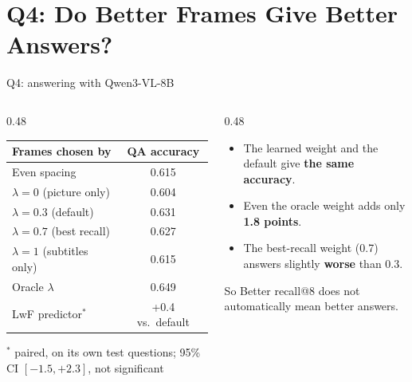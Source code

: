 \documentclass[aspectratio=169,11pt]{beamer}
\newcommand{\lam}{\lambda}
\newcommand{\strong}[1]{\textcolor{mbzuai-navy}{\textbf{#1}}}
\newcommand{\bad}[1]{\textcolor{red!65!black}{\textbf{#1}}}
\begin{document}
\section{Q4: Do Better Frames Give Better Answers?}

\begin{frame}{Q4: answering with Qwen3-VL-8B}
  \begin{columns}[c,onlytextwidth]
    \begin{column}{0.48\textwidth}
      \centering
      \small
      \begin{tabular}{lc}
        \toprule
        Frames chosen by & QA accuracy \\
        \midrule
        Even spacing & 0.615 \\
        $\lam=0$ (picture only) & 0.604 \\
        \rowcolor{mbzuai-light-gray}
        $\lam=0.3$ (default) & 0.631 \\
        $\lam=0.7$ (best recall) & 0.627 \\
        $\lam=1$ (subtitles only) & 0.615 \\
        Oracle $\lam$ & 0.649 \\
        \midrule
        LwF predictor$^*$ & +0.4 vs.\ default \\
        \bottomrule
      \end{tabular}
      \par\vspace{1mm}
      {\scriptsize $^*$ paired, on its own test questions; 95\% CI $[-1.5, +2.3]$, not significant}
    \end{column}
    \begin{column}{0.48\textwidth}
      \begin{itemize}
        \item The learned weight and the default give \strong{the same accuracy}.
        \item Even the oracle weight adds only \strong{1.8 points}.
        \item The best-recall weight (0.7) answers slightly \bad{worse} than 0.3.
      \end{itemize}
      \vspace{2mm}
      \begin{alertblock}{So}
        Better recall@8 does not automatically mean better answers.
      \end{alertblock}
    \end{column}
  \end{columns}
\end{frame}
\end{document}
